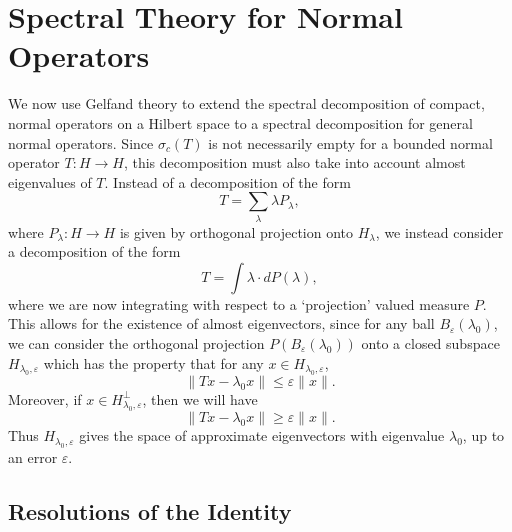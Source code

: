 \chapter{Spectral Theory for Normal Operators}

We now use Gelfand theory to extend the spectral decomposition of compact, normal operators on a Hilbert space to a spectral decomposition for general normal operators. Since $\sigma_c(T)$ is not necessarily empty for a bounded normal operator $T: H \to H$, this decomposition must also take into account almost eigenvalues of $T$. Instead of a decomposition of the form
%
\[ T = \sum_\lambda \lambda P_\lambda, \]
%
where $P_\lambda: H \to H$ is given by orthogonal projection onto $H_\lambda$, we instead consider a decomposition of the form
%
\[ T = \int \lambda \cdot dP(\lambda), \]
%
where we are now integrating with respect to a `projection' valued measure $P$. This allows for the existence of almost eigenvectors, since for any ball $B_\varepsilon(\lambda_0)$, we can consider the orthogonal projection $P(B_\varepsilon(\lambda_0))$ onto a closed subspace $H_{\lambda_0,\varepsilon}$ which has the property that for any $x \in H_{\lambda_0,\varepsilon}$,
%
\[ \| Tx - \lambda_0 x \| \leq \varepsilon \| x \|. \]
%
Moreover, if $x \in H_{\lambda_0,\varepsilon}^\perp$, then we will have
%
\[ \| Tx - \lambda_0 x \| \geq \varepsilon \| x \|. \]
%
Thus $H_{\lambda_0,\varepsilon}$ gives the space of approximate eigenvectors with eigenvalue $\lambda_0$, up to an error $\varepsilon$.

\section{Resolutions of the Identity}

